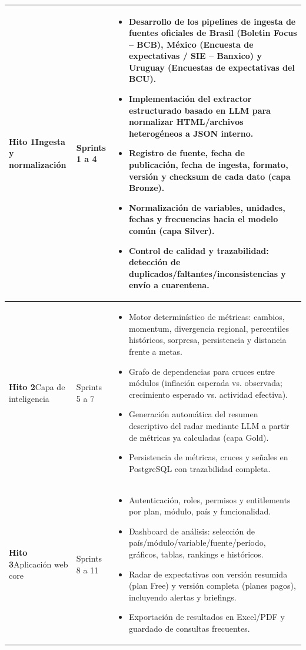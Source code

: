 \documentclass[11pt,a4paper]{article}
\begin{document}
\begin{longtable}{@{}>{\raggedright\arraybackslash}p{2.6cm} >{\raggedright\arraybackslash}p{2cm} >{\raggedright\arraybackslash}p{\dimexpr\textwidth-2.6cm-2cm-6\tabcolsep\relax}@{}}
\textbf{Hito 1}\newline Ingesta y normalizaci\'on & Sprints 1 a 4 &
\begin{itemize}[leftmargin=1em]
  \item Desarrollo de los pipelines de ingesta de fuentes oficiales de Brasil (Boletin Focus -- BCB), M\'exico (Encuesta de expectativas / SIE -- Banxico) y Uruguay (Encuestas de expectativas del BCU).
  \item Implementaci\'on del extractor estructurado basado en LLM para normalizar HTML/archivos heterog\'eneos a JSON interno.
  \item Registro de fuente, fecha de publicaci\'on, fecha de ingesta, formato, versi\'on y checksum de cada dato (capa Bronze).
  \item Normalizaci\'on de variables, unidades, fechas y frecuencias hacia el modelo com\'un (capa Silver).
  \item Control de calidad y trazabilidad: detecci\'on de duplicados/faltantes/inconsistencias y env\'io a cuarentena.
\end{itemize} \\
\midrule

\textbf{Hito 2}\newline Capa de inteligencia & Sprints 5 a 7 &
\begin{itemize}[leftmargin=1em]
  \item Motor determin\'istico de m\'etricas: cambios, momentum, divergencia regional, percentiles hist\'oricos, sorpresa, persistencia y distancia frente a metas.
  \item Grafo de dependencias para cruces entre m\'odulos (inflaci\'on esperada vs. observada; crecimiento esperado vs. actividad efectiva).
  \item Generaci\'on autom\'atica del resumen descriptivo del radar mediante LLM a partir de m\'etricas ya calculadas (capa Gold).
  \item Persistencia de m\'etricas, cruces y se\~nales en PostgreSQL con trazabilidad completa.
\end{itemize} \\
\midrule

\textbf{Hito 3}\newline Aplicaci\'on web core & Sprints 8 a 11 &
\begin{itemize}[leftmargin=1em]
  \item Autenticaci\'on, roles, permisos y entitlements por plan, m\'odulo, pa\'is y funcionalidad.
  \item Dashboard de an\'alisis: selecci\'on de pa\'is/m\'odulo/variable/fuente/per\'iodo, gr\'aficos, tablas, rankings e hist\'oricos.
  \item Radar de expectativas con versi\'on resumida (plan Free) y versi\'on completa (planes pagos), incluyendo alertas y briefings.
  \item Exportaci\'on de resultados en Excel/PDF y guardado de consultas frecuentes.
\end{itemize} \\
\midrule


\end{longtable}
\end{document}
